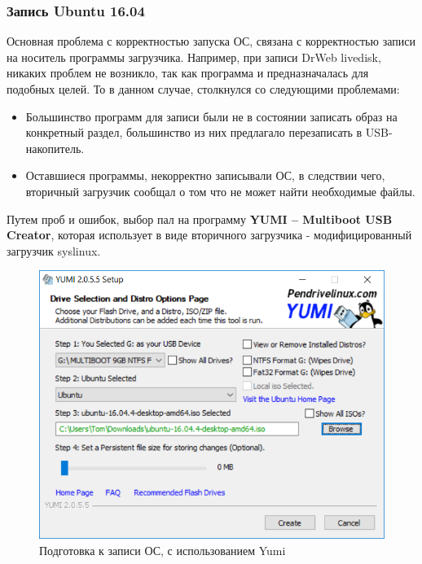\subsubsection{Запись Ubuntu 16.04}
Основная проблема с корректностью запуска ОС, связана с корректностью записи на носитель программы загрузчика. Например, при записи DrWeb livedisk, никаких проблем не возникло, так как программа и предназначалась для подобных целей. То в данном случае, столкнулся со следующими проблемами:
\begin{itemize}
\item Большинство программ для записи были не в состоянии записать образ на конкретный раздел, большинство из них предлагало перезаписать в USB-накопитель.
\item Оставшиеся программы, некорректно записывали ОС, в следствии чего, вторичный загрузчик сообщал о том что не может найти необходимые файлы.
\end{itemize}
Путем проб и ошибок, выбор пал на программу \textbf{YUMI – Multiboot USB Creator}, которая использует в виде вторичного загрузчика - модифицированный загрузчик syslinux.
\begin{figure}[H]
  \centering
  \includegraphics[width=.9\textwidth]{img/p3/yumi}
  \caption{Подготовка к записи ОС, с использованием Yumi}
\end{figure}


